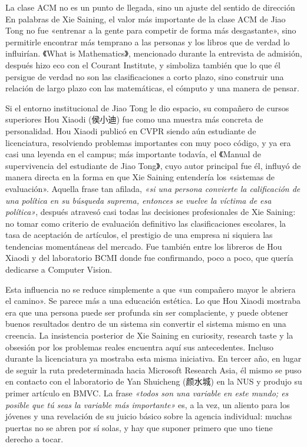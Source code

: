 \documentclass[a4paper,12pt]{article}
\begin{document}
\begin{importantbox}{La clase ACM no es un punto de llegada, sino un ajuste del sentido de dirección}
En palabras de Xie Saining, el valor más importante de la clase ACM de Jiao Tong no fue «entrenar a la gente para competir de forma más desgastante», sino permitirle encontrar más temprano a las personas y los libros que de verdad lo influirían. 《What is Mathematics》, mencionado durante la entrevista de admisión, después hizo eco con el Courant Institute, y simboliza también que lo que él persigue de verdad no son las clasificaciones a corto plazo, sino construir una relación de largo plazo con las matemáticas, el cómputo y una manera de pensar.
\end{importantbox}

Si el entorno institucional de Jiao Tong le dio espacio, su compañero de cursos superiores Hou Xiaodi (侯小迪) fue como una muestra más concreta de personalidad. Hou Xiaodi publicó en CVPR siendo aún estudiante de licenciatura, resolviendo problemas importantes con muy poco código, y ya era casi una leyenda en el campus; más importante todavía, el 《Manual de supervivencia del estudiante de Jiao Tong》, cuyo autor principal fue él, influyó de manera directa en la forma en que Xie Saining entendería los «sistemas de evaluación». Aquella frase tan afilada, \textit{«si una persona convierte la calificación de una política en su búsqueda suprema, entonces se vuelve la víctima de esa política»}, después atravesó casi todas las decisiones profesionales de Xie Saining: no tomar como criterio de evaluación definitivo las clasificaciones escolares, la tasa de aceptación de artículos, el prestigio de una empresa ni siquiera las tendencias momentáneas del mercado. Fue también entre los libreros de Hou Xiaodi y del laboratorio BCMI donde fue confirmando, poco a poco, que quería dedicarse a Computer Vision.

Esta influencia no se reduce simplemente a que «un compañero mayor le abriera el camino». Se parece más a una educación estética. Lo que Hou Xiaodi mostraba era que una persona puede ser profunda sin ser complaciente, y puede obtener buenos resultados dentro de un sistema sin convertir el sistema mismo en una creencia. La insistencia posterior de Xie Saining en curiosity, research taste y la obsesión por los problemas reales encuentra aquí sus antecedentes. Incluso durante la licenciatura ya mostraba esta misma iniciativa. En tercer año, en lugar de seguir la ruta predeterminada hacia Microsoft Research Asia, él mismo se puso en contacto con el laboratorio de Yan Shuicheng (颜水城) en la NUS y produjo su primer artículo en BMVC. La frase \textit{«todos son una variable en este mundo; es posible que tú seas la variable más importante»} es, a la vez, un aliento para los jóvenes y una revelación de su juicio básico sobre la agencia individual: muchas puertas no se abren por sí solas, y hay que suponer primero que uno tiene derecho a tocar.
\end{document}
